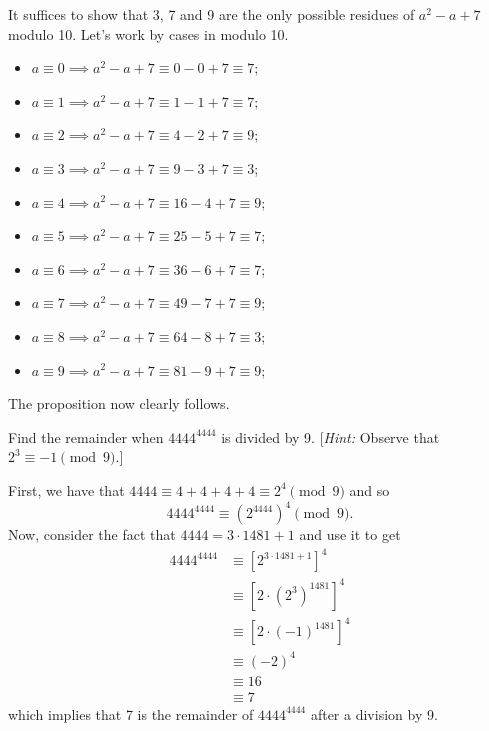 \begin{solution}
    It suffices to show that 3, 7 and 9 are the only possible residues of $a^2 -a + 7$ modulo 10. Let's work by cases in modulo 10.
    \begin{itemize}
        \item $a\equiv 0 \implies a^2 - a + 7 \equiv 0 - 0 + 7 \equiv 7$;
        \item $a\equiv 1 \implies a^2 - a + 7 \equiv 1 - 1 + 7 \equiv 7$;
        \item $a\equiv 2 \implies a^2 - a + 7 \equiv 4 - 2 + 7 \equiv 9$;
        \item $a\equiv 3 \implies a^2 - a + 7 \equiv 9 - 3 + 7 \equiv 3$;
        \item $a\equiv 4 \implies a^2 - a + 7 \equiv 16 - 4 + 7 \equiv 9$;
        \item $a\equiv 5 \implies a^2 - a + 7 \equiv 25 - 5 + 7 \equiv 7$;
        \item $a\equiv 6 \implies a^2 - a + 7 \equiv 36 - 6 + 7 \equiv 7$;
        \item $a\equiv 7 \implies a^2 - a + 7 \equiv 49 - 7 + 7 \equiv 9$;
        \item $a\equiv 8 \implies a^2 - a + 7 \equiv 64 - 8 + 7 \equiv 3$;
        \item $a\equiv 9 \implies a^2 - a + 7 \equiv 81 - 9 + 7 \equiv 9$;
    \end{itemize}
    The proposition now clearly follows.\\
\end{solution}

\begin{exercise}
    Find the remainder when $4444^{4444}$ is divided by 9. [\textit{Hint:} Observe that $2^3 \equiv -1 \pmod{9}$.] \\
\end{exercise}

\begin{solution}
    First, we have that $4444 \equiv 4 + 4 + 4 + 4 \equiv 2^4 \pmod{9}$ and so 
    $$4444^{4444} \equiv (2^{4444})^4 \pmod{9}.$$
    Now, consider the fact that $4444 = 3\cdot 1481 + 1$ and use it to get 
    \begin{align*}
        4444^{4444} &\equiv [2^{3\cdot 1481 + 1}]^4 \\
        &\equiv [2\cdot (2^3)^{1481}]^4 \\
        &\equiv [2\cdot (-1)^{1481}]^4 \\
        &\equiv (-2)^4 \\
        &\equiv 16 \\
        &\equiv 7
    \end{align*}
    which implies that 7 is the remainder of $4444^{4444}$ after a division by 9. \\
\end{solution}

